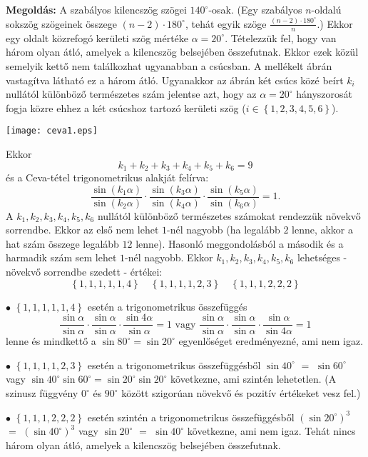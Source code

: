 \documentclass[a4paper,10pt]{article}
\begin{document}
{\bf Megoldás: } A szabályos kilencszög szögei
$140^{\circ}$-osak. (Egy sza\-bályos $n$-oldalú sokszög
szögeinek összege $(n-2)\cdot180^{\circ}$, tehát egyik
szöge $\frac{(n-2)\cdot180^{\circ}}{n}$.) Ekkor egy oldalt
közrefogó kerületi szög mértéke
$\alpha=20^{\circ}$. Tételezzük fel, hogy van három
olyan átló, amelyek a kilencszög belsejében
összefutnak. Ekkor ezek közül semelyik kettő nem
találkozhat ugyanabban a csúcsban. A mellékelt
ábrán vastagítva látható ez a három
átló. Ugyanakkor az ábrán két csúcs
közé beírt $k_{i}$ nullától
különböző természetes szám jelentse azt,
hogy az $\alpha=20^{\circ}$ hányszorosát fogja közre
ehhez a két csúcshoz tartozó kerületi szög
($i\in\left\{  1,2,3,4,5,6\right\}  $).
\begin{center}
\texttt{[image: ceva1.eps]}%
\end{center}
Ekkor
\[
k_{1}+k_{2}+k_{3}+k_{4}+k_{5}+k_{6}=9
\]
és a Ceva-tétel trigonometrikus alakját felírva:
\[
\frac{\sin\left(  k_{1}\alpha\right)  }{\sin\left(  k_{2}\alpha\right)  }%
\cdot\frac{\sin\left(  k_{3}\alpha\right)  }{\sin\left(
k_{4}\alpha\right) }\cdot\frac{\sin\left(  k_{5}\alpha\right)
}{\sin\left(  k_{6}\alpha\right) }=1.
\]
 A $k_{1},k_{2},k_{3},k_{4},k_{5},k_{6}$ nullától
különböző természetes számokat rendezzük
növekvő sorrendbe. Ekkor az első nem lehet $1$-nél
na\-gyobb (ha legalább $2$ lenne, akkor a hat szám
összege legalább $12$ lenne). Hasonló
meggondolásból a második és a harmadik
szám sem lehet $1$-nél nagyobb. Ekkor $k_{1},k_{2},k_{3},k_{4}%
,k_{5},k_{6}$ lehetséges - növekvő sorrendbe szedett -
értékei:%
$$\left\{  1,1,1,1,1,4\right\}  \quad \left\{  1,1,1,1,2,3\right\}
\quad \left\{  1,1,1,2,2,2\right\}  $$%

$\bullet$ $\left\{  1,1,1,1,1,4\right\}  $ esetén a
trigonometrikus
összefüggés%
\[
\frac{\sin\alpha}{\sin\alpha}\cdot\frac{\sin\alpha}{\sin\alpha}\cdot\frac
{\sin4\alpha}{\sin\alpha}=1\mbox{ vagy }\frac{\sin\alpha}{\sin\alpha}%
\cdot\frac{\sin\alpha}{\sin\alpha}\cdot\frac{\sin\alpha}{\sin4\alpha}=1
\]
lenne és mindkettő a $\sin80^{\circ}=\sin20^\circ$
egyenlőséget eredményezné, ami nem igaz.

$\bullet$ $\left\{  1,1,1,1,2,3\right\}  $ esetén a
trigonometrikus összefüggésből 
$\sin40^{\circ}$ $=$ $\sin60^{\circ}$ vagy
$\sin40^{\circ}\sin60^{\circ}=\sin20^{\circ}\sin20^{\circ}$
következne, ami szintén lehetetlen. (A szinusz
függvény $0^{\circ} $ és $90^{\circ}$ között
szi\-go\-rúan növekvő és pozitív
értékeket vesz fel.)

$\bullet$ $\left\{  1,1,1,2,2,2\right\}  $ esetén szintén a
trigonometrikus összefüggésből $\left(
\sin20^{\circ}\right) ^{3}$ $=$ $\left(  \sin40^{\circ}\right) ^{3}$
vagy $\sin20^{\circ}$ $=$ $\sin40^{\circ}$ következne, ami nem
igaz. \newline Tehát nincs három olyan átló, amelyek
a kilencszög belsejében összefutnak.
\end{document}

